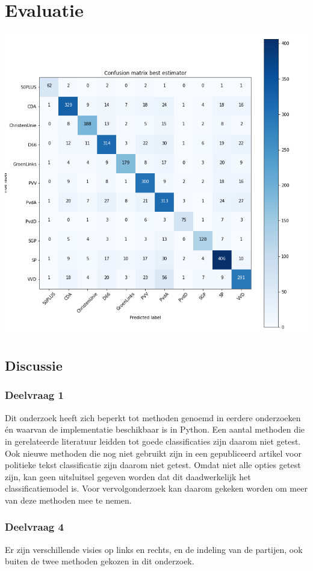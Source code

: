 \section{Evaluatie}
\label{sec:eva}


\includegraphics[width=0.6\paperwidth]{Verslag/confusionmatrix.png}

\subsection{Discussie}
\subsubsection{Deelvraag 1}
Dit onderzoek heeft zich beperkt tot methoden genoemd in eerdere onderzoeken én waarvan de implementatie beschikbaar is in Python. Een aantal methoden die in gerelateerde literatuur leidden tot goede classificaties zijn daarom niet getest. Ook nieuwe methoden die nog niet gebruikt zijn in een gepubliceerd artikel voor politieke tekst classificatie zijn daarom niet getest. Omdat niet alle opties getest zijn, kan geen uitsluitsel gegeven worden dat dit daadwerkelijk het classificatiemodel is. Voor vervolgonderzoek kan daarom gekeken worden om meer van deze methoden mee te nemen.\par

\subsubsection{Deelvraag 4}
Er zijn verschillende visies op links en rechts, en de indeling van de partijen, ook buiten de twee methoden gekozen in dit onderzoek.\par